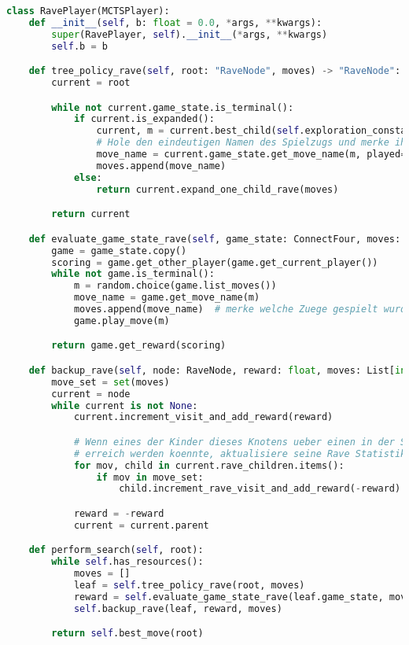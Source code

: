 \begin{lstlisting}[language=Python,label={lst:raveplayer}]
class RavePlayer(MCTSPlayer):
    def __init__(self, b: float = 0.0, *args, **kwargs):
        super(RavePlayer, self).__init__(*args, **kwargs)
        self.b = b

    def tree_policy_rave(self, root: "RaveNode", moves) -> "RaveNode":
        current = root

        while not current.game_state.is_terminal():
            if current.is_expanded():
                current, m = current.best_child(self.exploration_constant, b=self.b)
                # Hole den eindeutigen Namen des Spielzugs und merke ihn
                move_name = current.game_state.get_move_name(m, played=True)
                moves.append(move_name)
            else:
                return current.expand_one_child_rave(moves)

        return current

    def evaluate_game_state_rave(self, game_state: ConnectFour, moves: List[int]) -> float:
        game = game_state.copy()
        scoring = game.get_other_player(game.get_current_player())
        while not game.is_terminal():
            m = random.choice(game.list_moves())
            move_name = game.get_move_name(m)
            moves.append(move_name)  # merke welche Zuege gespielt wurden
            game.play_move(m)

        return game.get_reward(scoring)

    def backup_rave(self, node: RaveNode, reward: float, moves: List[int]):
        move_set = set(moves)
        current = node
        while current is not None:
            current.increment_visit_and_add_reward(reward)

            # Wenn eines der Kinder dieses Knotens ueber einen in der Simulation gemachten Spielzug
            # erreich werden koennte, aktualisiere seine Rave Statistik
            for mov, child in current.rave_children.items():
                if mov in move_set:
                    child.increment_rave_visit_and_add_reward(-reward)

            reward = -reward
            current = current.parent

    def perform_search(self, root):
        while self.has_resources():
            moves = []
            leaf = self.tree_policy_rave(root, moves)
            reward = self.evaluate_game_state_rave(leaf.game_state, moves)
            self.backup_rave(leaf, reward, moves)

        return self.best_move(root)
\end{lstlisting}


